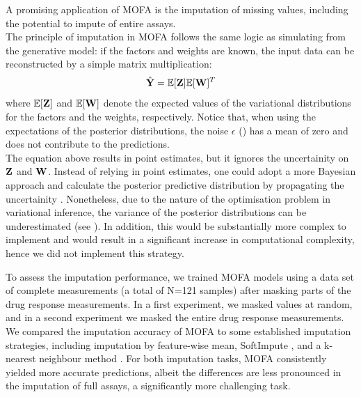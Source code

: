 A promising application of MOFA is the imputation of missing values, including the potential to impute of entire assays.\\
The principle of imputation in MOFA follows the same logic as simulating from the generative model: if the factors and weights are known, the input data can be reconstructed by a simple matrix multiplication:
\[
	\hat{{\bf Y}} = \mathbb{E}[{\bf Z}] \mathbb{E}[{\bf W}]^T
\]
where $\mathbb{E}[{\bf Z}]$ and $\mathbb{E}[{\bf W}]$ denote the expected values of the variational distributions for the factors and the weights, respectively. Notice that, when using the expectations of the posterior distributions, the noise $\epsilon$ () has a mean of zero and does not contribute to the predictions.\\
The equation above results in point estimates, but it ignores the uncertainity on ${\bf Z}$ and ${\bf W}$. Instead of relying in point estimates, one could adopt a more Bayesian approach and calculate the posterior predictive distribution by propagating the uncertainity \cite{Gelman2013}. Nonetheless, due to the nature of the optimisation problem in variational inference, the variance of the posterior distributions can be underestimated (see ). In addition, this would be substantially more complex to implement and would result in a significant increase in computational complexity, hence we did not implement this strategy.

To assess the imputation performance, we trained MOFA models using a data set of complete measurements (a total of N=121 samples) after masking parts of the drug response measurements. In a first experiment, we masked values at random, and in a second experiment we masked the entire drug response measurements. We compared the imputation accuracy of MOFA to some established imputation strategies, including imputation by feature-wise mean, SoftImpute \cite{Mazumder2010}, and a k-nearest neighbour method \cite{Troyanskaya2001}. For both imputation tasks, MOFA consistently yielded more accurate predictions, albeit the differences are less pronounced in the imputation of full assays, a significantly more challenging task.\\

